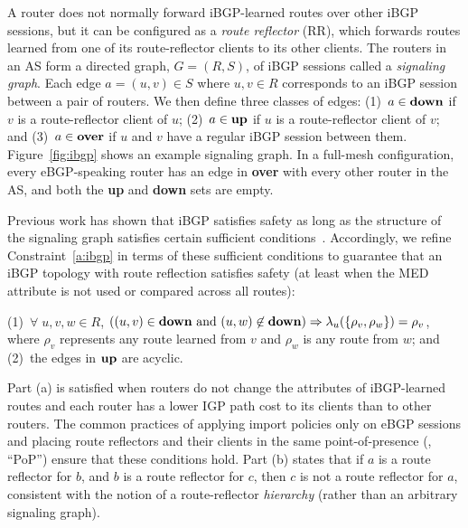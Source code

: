 A router does not normally forward iBGP-learned routes over other iBGP
sessions, but it can be configured as a {\em route reflector\/} (RR),
which forwards routes learned from one of its route-reflector clients to
its other clients.  The routers in an AS form a directed graph, $G =
(R,S)$, of iBGP sessions called a {\em signaling graph}. Each edge $a =
(u,v) \in S$ where $u,v \in R$ corresponds to an iBGP session between a
pair of routers. We then define three classes of edges: (1)~$a \in \mbox{{\bf
down}}$ if $v$ is a route-reflector client of $u$; (2)~$a \in \mbox{{\bf
up}}$ if $u$ is a route-reflector client of $v$; and (3)~$a \in
\mbox{{\bf over}}$ if $u$ and $v$ have a regular iBGP session between
them.  Figure~\ref{fig:ibgp} shows an example signaling
graph.  In a full-mesh configuration, every eBGP-speaking router has an edge
in {\bf over} with every other router in the AS, 
and both the {\bf up} and {\bf down} sets are empty. 



Previous work has shown that iBGP satisfies safety as long as the
structure of the signaling graph satisfies certain sufficient
conditions~\cite{Griffin2002}.  Accordingly, we refine
Constraint~\ref{a:ibgp} in terms of these sufficient conditions to
guarantee that an iBGP topology with route reflection satisfies safety
(at least when the MED attribute is not used or compared across all
routes):

\begin{constraint}
\label{a:sane2}
(1)~$\forall \;u,v,w \in R$, $((u,v) \in \mbox{{\bf down}} \mbox{
  and } (u,w) \not\in \mbox{{\bf down}}) \Rightarrow
  \lambda_u(\{\rho_v,\rho_w\}) = \rho_v$, where $\rho_v$ represents any route
  learned from $v$ and $\rho_w$ is any route from $w$;
and (2)~the edges in $\mbox{{\bf up}}$ are acyclic.
\end{constraint}
\vspace{0.1in}

\noindent
Part (a) is satisfied when routers do not change the attributes of
iBGP-learned routes and each router has a lower IGP path cost to its
clients than to other routers. The common practices of applying import
policies only on eBGP sessions and placing route reflectors and their
clients in 
the same point-of-presence (\ie, ``PoP'') ensure that these
conditions hold.
%
Part (b) states that if $a$ is a route reflector for $b$, and $b$ is a
route reflector for $c$, then 
$c$ is not a route reflector for $a$, consistent with the notion of a
route-reflector {\em hierarchy} (rather than an arbitrary signaling graph).  


